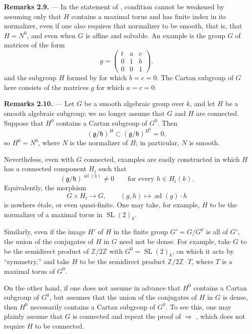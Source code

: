 \medskip
\noindent{}\textbf{Remarks 2.9.} ---
In the statement of , condition  cannot be weakened by
assuming only that \(H\) contains a maximal torus and has finite
index in its normalizer, even if one also requires that normalizer to
be smooth, that is, that \(H=N^0\), and even when \(G\) is affine and
solvable. An example is the group \(G\) of matrices of the form
\[
  g=
  \begin{pmatrix}
    t & a & c\\
    0 & 1 & b\\
    0 & 0 & 1
  \end{pmatrix},
\]
and the subgroup \(H\) formed by  for which
\(b=c=0\). The Cartan subgroup of \(G\) here consists of the matrices
\(g\) for which \(a=c=0\).

\medskip
\noindent{}\textbf{Remarks 2.10.} ---
Let \(G\) be a smooth algebraic group over \(k\), and let \(H\) be a
smooth algebraic subgroup; we no longer assume that \(G\) and \(H\)
are connected. Suppose that \(H^0\) contains a Cartan subgroup of
\(G^0\). Then
\[
  (\mathfrak g/\mathfrak h)^H
  \subset(\mathfrak g/\mathfrak h)^{H^0}=0,
\]
so \(H^0=N^0\), where \(N\) is the normalizer of \(H\); in
particular, \(N\) is smooth.

Nevertheless, even with \(G\) connected, examples are easily
constructed in which \(H\) has a connected component \(H_i\) such
that
\[
  (\mathfrak g/\mathfrak h)^{\operatorname{ad}(h)}\neq0
  \qquad\text{for every }h\in H_i(k).
\]
Equivalently, the morphism
\[
  G\times H_i\longrightarrow G,\qquad
  (g,h)\longmapsto\operatorname{ad}(g)\cdot h
\]
is nowhere étale, or even quasi-finite. One may take, for example,
\(H\) to be the normalizer of a maximal torus in
\(\operatorname{SL}(2)_k\).

Similarly, even if the image \(H'\) of \(H\) in the finite group
\(G'=G/G^0\) is all of \(G'\), the union of the conjugates of \(H\)
in \(G\) need not be dense. For example, take \(G\) to be the
semidirect product of \(\mathbb Z/2\mathbb Z\) with
\(G^0=\operatorname{SL}(2)_k\), on which it acts by ``symmetry,'' and
take \(H\) to be the semidirect product
\(\mathbb Z/2\mathbb Z\cdot T\), where \(T\) is a maximal torus of
\(G^0\).

On the other hand, if one does not assume in advance that \(H^0\)
contains a Cartan subgroup of \(G^0\), but assumes that the union of
the conjugates of \(H\) in \(G\) is dense, then \(H^0\) necessarily
contains a Cartan subgroup of \(G^0\). To see this, one may plainly
assume that \(G\) is connected and repeat the proof of
 \(\Rightarrow\) , which does not require \(H\) to be
connected.
